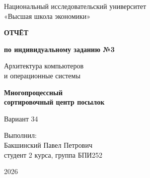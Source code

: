 \documentclass[a4paper,12pt]{article}
\begin{document}
\begin{titlepage}
    \centering
    Национальный исследовательский университет\\[0.4em]
    «Высшая школа экономики»

    \vfill
    \begin{tcolorbox}[myboxstyle,colback=remark_back,colframe=remark_frame,
        boxrule=0.8pt,top=9mm,bottom=9mm]
        \centering
        {\Large\bfseries\color{report_accent} ОТЧЁТ\par}
        \vspace{0.5cm}
        {\large\bfseries по индивидуальному заданию №3\par}
        \vspace{1cm}
        Архитектура компьютеров\\и операционные системы
        \vspace{1cm}

        {\Large\bfseries\color{report_accent} Многопроцессный\\сортировочный центр посылок\par}
        \vspace{0.5cm}
        {\large Вариант 34\par}
    \end{tcolorbox}

    \vfill
    \begin{flushright}
        Выполнил:\\[0.4em]
        Бакшинский Павел Петрович\\[0.4em]
        студент 2 курса, группа БПИ252
    \end{flushright}
    \vfill
    \materialsbutton
    \par\vspace{0.8cm}
    2026
\end{titlepage}

\pagestyle{plain}
\setcounter{page}{2}
\setlength{\parskip}{3pt}

\end{document}
